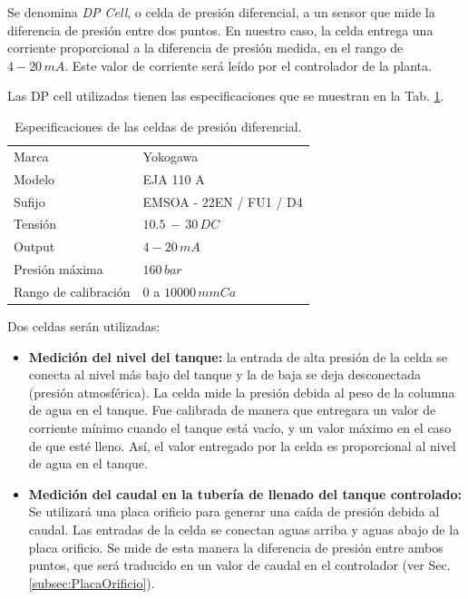 Se denomina \textit{DP Cell}, o celda de presión diferencial, a un sensor
que mide la diferencia de presión entre dos puntos.
En nuestro caso, la celda entrega una corriente proporcional a la diferencia de
presión medida, en el rango de $4-20\,mA$.
Este valor de corriente será leído por el controlador de la planta.

Las DP cell utilizadas tienen las especificaciones que se muestran en la Tab.
\ref{tab:caractDPcell}.

\begin{table}[ht]
\renewcommand{\arraystretch}{1.3}
\centering
\begin{tabular}{|l|l|}
\hline
Marca & Yokogawa\\
Modelo & EJA 110 A\\
Sufijo & EMSOA - 22EN / FU1 / D4\\
Tensión & $10.5\,-\,30 \, DC$\\
Output & $4-20\,mA$\\
Presión máxima & $160\,bar$\\
Rango de calibración & $0$ a $10000\,mmCa$\\
\hline
\end{tabular}
\caption{Especificaciones de las celdas de presión diferencial.}
\label{tab:caractDPcell}
\end{table}

Dos celdas serán utilizadas:
\begin{itemize}
 \item \textbf{Medición del nivel del tanque:} la entrada de alta presión de la
celda
se conecta  al nivel más bajo del tanque y la de baja se deja desconectada
(presión atmosférica).
La celda mide la presión debida al peso de la columna de agua en el tanque.
Fue calibrada de manera que entregara un valor de corriente mínimo
cuando el tanque está vacío, y un valor máximo en el caso de que esté
lleno.
Así, el valor entregado por la celda es proporcional al nivel de
agua en el tanque.

\item \textbf{Medición del caudal en la tubería de llenado del tanque
controlado:}
Se utilizará una placa orificio para generar una caída de presión debida al
caudal.
Las entradas de la celda se conectan aguas arriba y aguas abajo
de la placa orificio.
Se mide de esta manera la diferencia de presión entre ambos puntos, que será
traducido en un valor de caudal en el
controlador (ver Sec. \ref{subsec:PlacaOrificio}).
\end{itemize}

